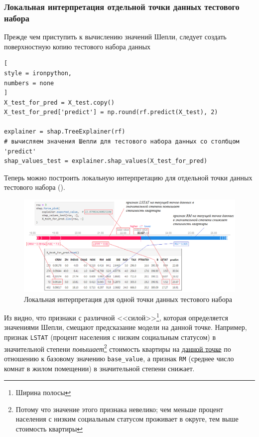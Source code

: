 \documentclass[%
	11pt,
	a4paper,
	utf8,
		]{article}
\begin{document}
\subsubsection{Локальная интерпретация отдельной точки данных тестового набора}

Прежде чем приступить к вычислению значений Шепли, следует создать поверхностную копию тестового набора данных

\begin{lstlisting}[
style = ironpython,
numbers = none
]
X_test_for_pred = X_test.copy()
X_test_for_pred['predict'] = np.round(rf.predict(X_test), 2)

explainer = shap.TreeExplainer(rf)
# вычисляем значения Шепли для тестового набора данных со столбцом 'predict'
shap_values_test = explainer.shap_values(X_test_for_pred)
\end{lstlisting}

Теперь можно построить локальную интерпретацию для отдельной точки данных тестового набора ().

\begin{figure}
	\centering
	\includegraphics[scale=0.7]{figures/shap_dependence_plt_test.png}
	\caption{ Локальная интерпретация для одной точки данных тестового набора }\label{fig:shap_dependence_plt_test}
\end{figure}

Из  видно, что признаки с различной <<силой>>\footnote{Ширина полосы}, которая определяется значениями Шепли, смещают предсказание модели на данной точке. Например, признак \texttt{LSTAT} (процент населения с низким социальным статусом) в значительной степени \emph{повышает}\footnote{Потому что значение этого признака невелико; чем меньше процент населения с низким социальным статусом проживает в округе, тем выше стоимость квартиры} стоимость квартиры на \underline{данной точке} по отношению к базовому значению \texttt{base\_value}, а признак \texttt{RM} (среднее число комнат в жилом помещении) в значительной степени снижает.
\end{document}
